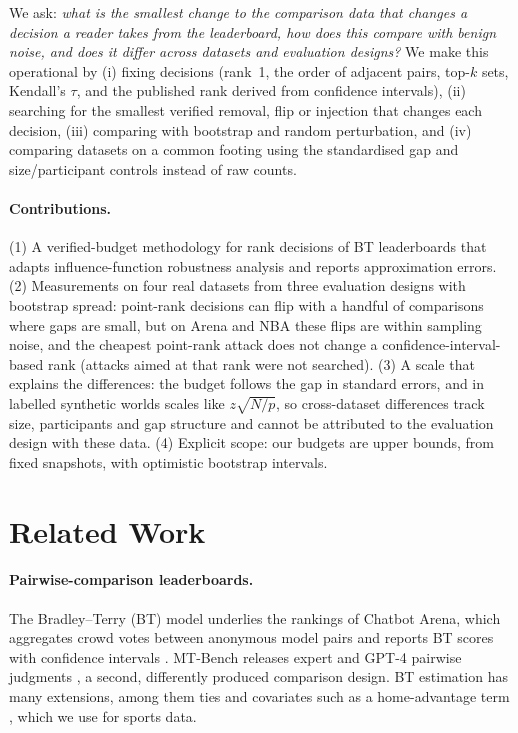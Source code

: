 \documentclass{article}
\begin{document}
We ask: \emph{what is the smallest change to the comparison data that changes a decision a reader takes from the leaderboard, how does this compare with benign noise, and does it differ across datasets and evaluation designs?}
We make this operational by (i) fixing decisions (rank~1, the order of adjacent pairs, top-$k$ sets, Kendall's $\tau$, and the published rank derived from confidence intervals), (ii) searching for the smallest verified removal, flip or injection that changes each decision, (iii) comparing with bootstrap and random perturbation, and (iv) comparing datasets on a common footing using the standardised gap and size/participant controls instead of raw counts.

\paragraph{Contributions.}
(1) A verified-budget methodology for rank decisions of BT leaderboards that adapts influence-function robustness analysis \citep{koh2017influence,broderick2020amip} and reports approximation errors.
(2) Measurements on four real datasets from three evaluation designs with bootstrap spread: point-rank decisions can flip with a handful of comparisons where gaps are small, but on Arena and NBA these flips are within sampling noise, and the cheapest point-rank attack does not change a confidence-interval-based rank (attacks aimed at that rank were not searched).
(3) A scale that explains the differences: the budget follows the gap in standard errors, and in labelled synthetic worlds scales like $z\sqrt{N/p}$, so cross-dataset differences track size, participants and gap structure and cannot be attributed to the evaluation design with these data.
(4) Explicit scope: our budgets are upper bounds, from fixed snapshots, with optimistic bootstrap intervals.

\section{Related Work}\label{sec:related}
\paragraph{Pairwise-comparison leaderboards.}
The Bradley--Terry (BT) model \citep{bradley1952} underlies the rankings of Chatbot Arena, which
aggregates crowd votes between anonymous model pairs and reports BT scores with confidence
intervals \citep{chiang2024arena}. MT-Bench releases expert and GPT-4 pairwise judgments
\citep{zheng2023judge}, a second, differently produced comparison design.
BT estimation has many extensions, among them ties and covariates such as a home-advantage term \citep{hunter2004mm,turner2012bt2}, which we use for sports data.
\end{document}

